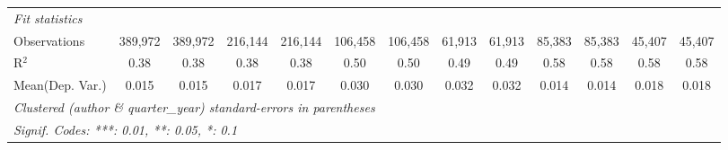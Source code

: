 \begin{tabular}{lcccccccccccc}
   \midrule
   \emph{Fit statistics}\\
   Observations                             & 389,972        & 389,972      & 216,144       & 216,144    & 106,458      & 106,458   & 61,913  & 61,913        & 85,383      & 85,383         & 45,407  & 45,407\\  
   R$^2$                                    & 0.38           & 0.38         & 0.38          & 0.38       & 0.50         & 0.50      & 0.49    & 0.49          & 0.58        & 0.58           & 0.58    & 0.58\\  
Mean(Dep. Var.) & 0.015 & 0.015 & 0.017 & 0.017 & 0.030 & 0.030 & 0.032 & 0.032 & 0.014 & 0.014 & 0.018 & 0.018 \\
   \midrule \midrule
   \multicolumn{13}{l}{\emph{Clustered (author \& quarter\_year) standard-errors in parentheses}}\\
   \multicolumn{13}{l}{\emph{Signif. Codes: ***: 0.01, **: 0.05, *: 0.1}}\\
\end{tabular}
\par\endgroup
